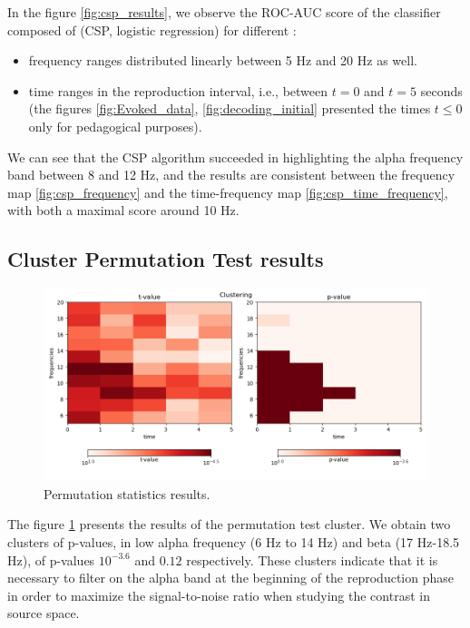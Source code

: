 
In the figure \ref{fig:csp_results}, we observe the ROC-AUC score of the classifier composed of (CSP, logistic regression) for different :

\begin{itemize}
    \item frequency ranges distributed linearly between 5 Hz and 20 Hz as well.
    \item time ranges in the reproduction interval, i.e., between $t=0$ and $t=5$ seconds (the figures \ref{fig:Evoked_data}, \ref{fig:decoding_initial} presented the times $t \leq 0$ only for pedagogical purposes).
\end{itemize}

We can see that the CSP algorithm succeeded in highlighting the alpha frequency band between 8 and 12 Hz, and the results are consistent between the frequency map \ref{fig:csp_frequency} and the time-frequency map \ref{fig:csp_time_frequency}, with both a maximal score around 10 Hz.

\subsection{Cluster Permutation Test results}

\begin{figure}[ht]
    \centering
    \includegraphics[width=15cm]{images_report/sensor/csp_permutation_res/permutations_test.png}
    \caption[Permutation statistics results.]%
    {Permutation statistics results.}
    \label{permutation_statistics_results}
\end{figure}

The figure \ref{permutation_statistics_results} presents the results of the permutation test cluster. We obtain two clusters of p-values, in low alpha frequency (6 Hz to 14 Hz) and beta (17 Hz-18.5 Hz), of p-values $10^{-3.6}$ and $0.12$ respectively. These clusters indicate that it is necessary to filter on the alpha band at the beginning of the reproduction phase in order to maximize the signal-to-noise ratio when studying the contrast in source space.

